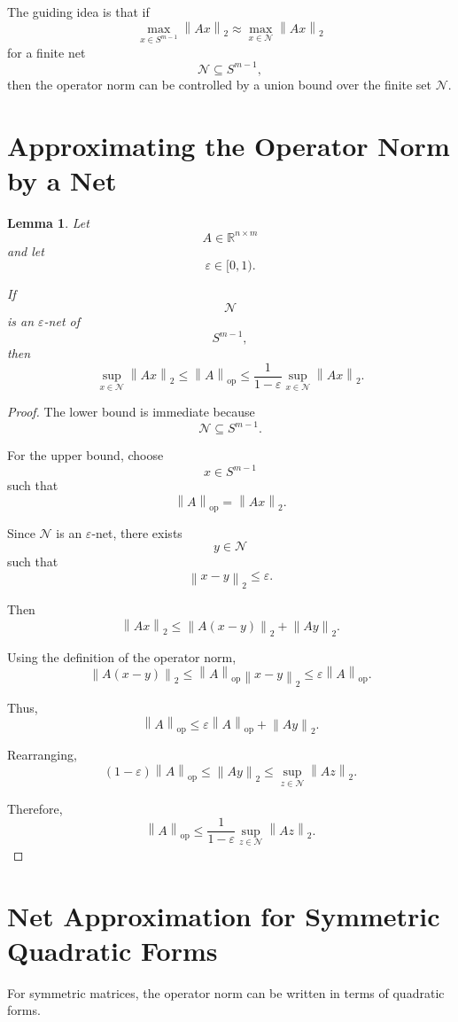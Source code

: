 \documentclass[12pt,oneside]{book}
\numberwithin{equation}{section}
\theoremstyle{definition}
\theoremstyle{plain}
\newtheorem{lemma}{Lemma}[section]
\theoremstyle{remark}
\newcommand{\R}{\mathbb{R}}
\newcommand{\norm}[1]{\left\lVert #1 \right\rVert}
\begin{document}
The guiding idea is that if
\[
\max_{x\in S^{m-1}}\norm{Ax}_2
\approx
\max_{x\in\mathcal{N}}\norm{Ax}_2
\]
for a finite net
\[
\mathcal{N}\subseteq S^{m-1},
\]
then the operator norm can be controlled by a union bound over the finite set $\mathcal{N}$.

\section{Approximating the Operator Norm by a Net}

\begin{lemma}
Let
\[
A\in\R^{n\times m}
\]
and let
\[
\varepsilon\in[0,1).
\]

If
\[
\mathcal{N}
\]
is an $\varepsilon$-net of
\[
S^{m-1},
\]
then
\[
\sup_{x\in\mathcal{N}}\norm{Ax}_2
\leq
\norm{A}_{\mathrm{op}}
\leq
\frac{1}{1-\varepsilon}
\sup_{x\in\mathcal{N}}\norm{Ax}_2.
\]
\end{lemma}

\begin{proof}
The lower bound is immediate because
\[
\mathcal{N}\subseteq S^{m-1}.
\]

For the upper bound, choose
\[
x\in S^{m-1}
\]
such that
\[
\norm{A}_{\mathrm{op}}=\norm{Ax}_2.
\]

Since $\mathcal{N}$ is an $\varepsilon$-net, there exists
\[
y\in\mathcal{N}
\]
such that
\[
\norm{x-y}_2\leq \varepsilon.
\]

Then
\[
\norm{Ax}_2
\leq
\norm{A(x-y)}_2+\norm{Ay}_2.
\]

Using the definition of the operator norm,
\[
\norm{A(x-y)}_2
\leq
\norm{A}_{\mathrm{op}}\norm{x-y}_2
\leq
\varepsilon\norm{A}_{\mathrm{op}}.
\]

Thus,
\[
\norm{A}_{\mathrm{op}}
\leq
\varepsilon\norm{A}_{\mathrm{op}}
+
\norm{Ay}_2.
\]

Rearranging,
\[
(1-\varepsilon)\norm{A}_{\mathrm{op}}
\leq
\norm{Ay}_2
\leq
\sup_{z\in\mathcal{N}}\norm{Az}_2.
\]

Therefore,
\[
\norm{A}_{\mathrm{op}}
\leq
\frac{1}{1-\varepsilon}
\sup_{z\in\mathcal{N}}\norm{Az}_2.
\]
\end{proof}

\section{Net Approximation for Symmetric Quadratic Forms}

For symmetric matrices, the operator norm can be written in terms of quadratic forms.
\end{document}
